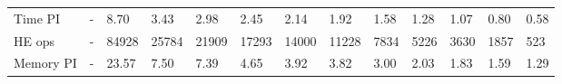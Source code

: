 \begin{table}
\begin{tabular}{lllllllllllll}
Time PI   &            - &             8.70 &               3.43 &               2.98 &               2.45 &             2.14 &             1.92 &             1.58 &             1.28 &             1.07 &            0.80 &             0.58 \\
HE ops    &            - &            84928 &              25784 &              21909 &              17293 &            14000 &            11228 &             7834 &             5226 &             3630 &            1857 &              523 \\
Memory PI &            - &            23.57 &               7.50 &               7.39 &               4.65 &             3.92 &             3.82 &             3.00 &             2.03 &             1.83 &            1.59 &             1.29 \\
\bottomrule
\end{tabular}
\end{table}
